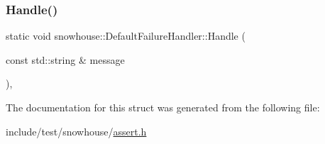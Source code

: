 \mbox{\label{structsnowhouse_1_1DefaultFailureHandler_ad66656c09b4beff2411affb067bef85c}} 
\subsubsection{\texorpdfstring{Handle()}{Handle()}\hspace{0.1cm}{\footnotesize\ttfamily [2/2]}}
{\footnotesize\ttfamily static void snowhouse\+::\+Default\+Failure\+Handler\+::\+Handle (\begin{DoxyParamCaption}\item[{const std\+::string \&}]{message }\end{DoxyParamCaption})\hspace{0.3cm}{\ttfamily [inline]}, {\ttfamily [static]}}



The documentation for this struct was generated from the following file\+:\begin{DoxyCompactItemize}
\item 
include/test/snowhouse/\mbox{\hyperlink{assert_8h}{assert.\+h}}\end{DoxyCompactItemize}

